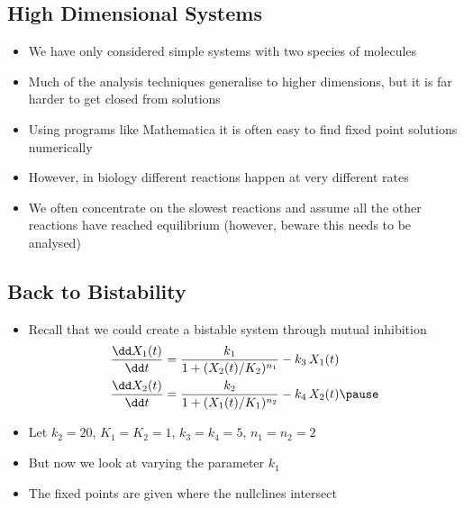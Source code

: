 
\begin{slide}
\section[-2]{High Dimensional Systems}

\begin{PauseHighLight}
  \begin{itemize}
  \item We have only considered simple systems with two species of
    molecules\pause
  \item Much of the analysis techniques generalise to higher dimensions,
    but it is far harder to get closed from solutions\pause
  \item Using programs like Mathematica it is often easy to find fixed
    point solutions numerically\pause
  \item However, in biology different reactions happen at very different
    rates\pause
  \item We often concentrate on the slowest reactions and assume all the
    other reactions have reached equilibrium (however, beware this needs
    to be analysed)\pause
  \end{itemize}
\end{PauseHighLight}

\end{slide}

\Outline %

\begin{slide}
\section{Back to Bistability}

\begin{PauseHighLight}
  \begin{itemize}
  \item Recall that we could create a bistable system through mutual
    inhibition
    \begin{align*}
      \frac{\dd X_1(t)}{\dd t} &= \frac{k_1}{1+(X_2(t)/K_2)^{n_1}} - k_3 \, X_1(t)\\
      \frac{\dd X_2(t)}{\dd t} &= \frac{k_2}{1+(X_1(t)/K_1)^{n_2}} - k_4\,X_2(t)\pause
    \end{align*}
  \item Let $k_2=20$, $K_1=K_2=1$, $k_3=k_4=5$, $n_1=n_2=2$\pause
  \item But now we look at varying the parameter $k_1$\pause
  \item The fixed points are given where the nullclines intersect\pause
  \end{itemize}
\end{PauseHighLight}

\end{slide}

